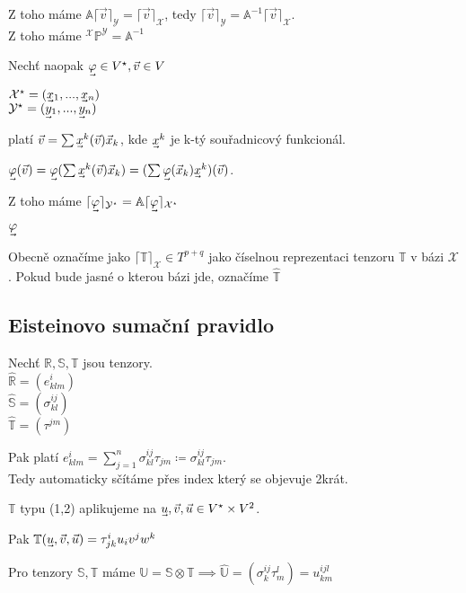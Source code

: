 \documentclass[../main.tex]{subfiles}
\begin{document}
 Z toho máme $\mathbb{A}\lceil\vec{v}\rceil_\mathcal{Y} = \lceil\vec{v}\rceil_\mathcal{X} $, tedy 
 $\lceil\vec{v}\rceil_\mathcal{Y} = \mathbb{A}^{-1} \lceil\vec{v}\rceil_\mathcal{X} $.\\
 Z toho máme $^\mathcal{X}\mathbb{P}^\mathcal{Y} = \mathbb{A}^{-1}$


Nechť naopak $\uvec{\varphi} \in V^\star, \vec{v}\in V$

$\mathcal{X}^\star = (\uvec{x}_1, ... , \uvec{x}_n)$\\
$\mathcal{Y}^\star = (\uvec{y}_1, ... , \uvec{y}_n)$

platí $\vec{v} = \sum \uvec{x}^k (\vec{v}) \vec{x}_k$, kde $\uvec{x}^k$ je k-tý souřadnicový funkcionál.

$\uvec{\varphi} (\vec{v}) = \uvec{\varphi} (\sum \uvec{x}^k (\vec{v}) \vec{x}_k) = (\sum \uvec{\varphi} (\vec{x}_k) \uvec{x}^k) (\vec{v})$.

Z toho máme $\lceil\uvec{\varphi}\rceil_{\mathcal{Y}^\star} = \mathbb{A}\lceil\uvec{\varphi}\rceil_{\mathcal{X}^\star}$

$\uvec{\varphi}$

Obecně označíme jako $\lceil \mathbb{T} \rceil_\mathcal{X} \in T^{p+q}$ jako číselnou reprezentaci tenzoru $\mathbb{T}$ v bázi $\mathcal{X}$.
Pokud bude jasné o kterou bázi jde, označíme $\hat{\mathbb{T}}$

\subsection{Eisteinovo sumační pravidlo}
Nechť $\mathbb{R},\mathbb{S},\mathbb{T}$ jsou tenzory.\\
$\hat{\mathbb{R}} = (e^i_{klm})$\\
$\hat{\mathbb{S}} = (\sigma^{ij}_{kl})$\\
$\hat{\mathbb{T}} = (\tau^{jm})$

Pak platí $e^i_{klm} = \sum_{j=1}^n \sigma^{ij}_{kl} \tau_{jm} \coloneq \sigma_{kl}^{ij} \tau_{jm}$.\\
Tedy automaticky sčítáme přes index který se objevuje 2krát. 

\begin{example}
    $\mathbb{T}$ typu (1,2) aplikujeme na $\uvec{u}, \vec{v}, \vec{u} \in V^\star \times V^2$.

    Pak $\mathbb{T} (\uvec{u}, \vec{v}, \vec{u} ) = \tau^i_{jk} u_i v^j w^k $
\end{example}

\begin{definition}
    Pro tenzory $\mathbb{S}, \mathbb{T}$ máme $\mathbb{U} = \mathbb{S} \otimes \mathbb{T} \implies \hat{\mathbb{U}} = 
    (\sigma_k^{ij} \tau_m^l) = u^{ijl}_{km}$
\end{definition}
\end{document}
